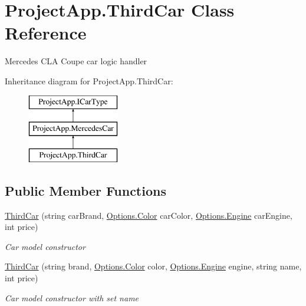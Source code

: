 \hypertarget{class_project_app_1_1_third_car}{}\section{Project\+App.\+Third\+Car Class Reference}
\label{class_project_app_1_1_third_car}


Mercedes C\+LA Coupe car logic handler  


Inheritance diagram for Project\+App.\+Third\+Car\+:\begin{figure}[H]
\begin{center}
\leavevmode
\includegraphics[height=3.000000cm]{class_project_app_1_1_third_car}
\end{center}
\end{figure}
\subsection*{Public Member Functions}
\begin{DoxyCompactItemize}
\item 
\mbox{\hyperlink{class_project_app_1_1_third_car_a89b0b9c635e4e52de95ac9366b885bb6}{Third\+Car}} (string car\+Brand, \mbox{\hyperlink{class_project_app_1_1_options_aaa68b08af20deeebf73e6bc6de725c44}{Options.\+Color}} car\+Color, \mbox{\hyperlink{class_project_app_1_1_options_a95e313182e8122da719f7c8caefcc88d}{Options.\+Engine}} car\+Engine, int price)
\begin{DoxyCompactList}\small\item\em Car model constructor \end{DoxyCompactList}\item 
\mbox{\hyperlink{class_project_app_1_1_third_car_a6fcef24fb55ca7c4cd66987a4cc0af14}{Third\+Car}} (string brand, \mbox{\hyperlink{class_project_app_1_1_options_aaa68b08af20deeebf73e6bc6de725c44}{Options.\+Color}} color, \mbox{\hyperlink{class_project_app_1_1_options_a95e313182e8122da719f7c8caefcc88d}{Options.\+Engine}} engine, string name, int price)
\begin{DoxyCompactList}\small\item\em Car model constructor with set name \end{DoxyCompactList}\end{DoxyCompactItemize}
